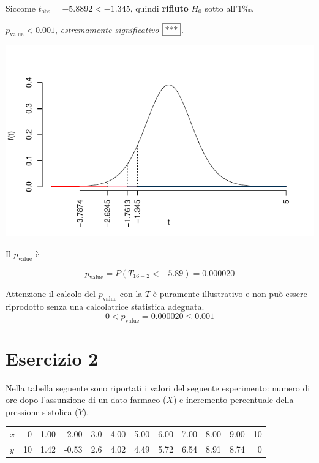\documentclass[
  11pt,
]{book}
\theoremstyle{mytheoremstyle}
\theoremstyle{mydefstyle}
\newenvironment{sol}
  {
  \begin{tcolorbox}[enhanced,breakable,arc=0.1mm,boxrule=1pt,colback=white,colframe=iblue,
  title=\bf \fontfamily{lmss}\selectfont \hspace{.5 cm} Soluzione,drop fuzzy shadow]

}{
\end{tcolorbox}
  }
\begin{document}
\begin{sol}
Siccome \(t_\text{obs}=-5.8892<-1.345\), quindi \textbf{rifiuto} \(H_0\) sotto all'1‰,

\(p_\text{value}<0.001\), \emph{estremamente significativo} \(\fbox{***}\).

\begin{center}\includegraphics{Esami_passati_con_soluzioni_files/figure-latex/06-regr-8,-1} \end{center}

Il \(p_{\text{value}}\) è

\[ p_{\text{value}} = P(T_{16-2}<-5.89)=0.000020 \]

Attenzione il calcolo del \(p_\text{value}\) con la \(T\) è puramente illustrativo e non può essere riprodotto senza una calcolatrice statistica adeguata.\[
 0 < p_\text{value}= 0.000020 \leq 0.001 
\]

\end{sol}

\section{Esercizio 2}\label{esercizio-2-3}

Nella tabella seguente sono riportati i valori del seguente
esperimento: numero di ore dopo l'assunzione di un dato farmaco
(\(X\)) e incremento percentuale della pressione sistolica (\(Y\)).

\begin{table}[H]
\centering
\begin{tabular}{lrrrrrrrrrrr}
\toprule
$x$ & 0 & 1.00 & 2.00 & 3.0 & 4.00 & 5.00 & 6.00 & 7.00 & 8.00 & 9.00 & 10\\
$y$ & 10 & 1.42 & -0.53 & 2.6 & 4.02 & 4.49 & 5.72 & 6.54 & 8.91 & 8.74 & 0\\
\bottomrule
\end{tabular}
\end{table}
\end{document}
